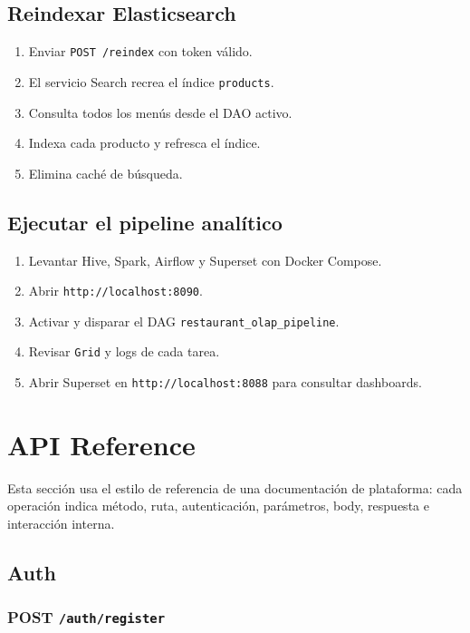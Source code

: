 \documentclass[12pt,letterpaper]{article}
\def\endpoint#1#2{\texttt{#1 #2}}
\def\codefile#1{\nolinkurl{#1}}
\def\methodpost{\textbf{\color{green!45!black}POST}}
\begin{document}
\subsection{Reindexar Elasticsearch}

\begin{enumerate}
    \item Enviar \endpoint{POST}{/reindex} con token válido.
    \item El servicio Search recrea el índice \codefile{products}.
    \item Consulta todos los menús desde el DAO activo.
    \item Indexa cada producto y refresca el índice.
    \item Elimina caché de búsqueda.
\end{enumerate}

\subsection{Ejecutar el pipeline analítico}

\begin{enumerate}
    \item Levantar Hive, Spark, Airflow y Superset con Docker Compose.
    \item Abrir \codefile{http://localhost:8090}.
    \item Activar y disparar el DAG \codefile{restaurant\_olap\_pipeline}.
    \item Revisar \codefile{Grid} y logs de cada tarea.
    \item Abrir Superset en \codefile{http://localhost:8088} para consultar dashboards.
\end{enumerate}

\section{API Reference}

Esta sección usa el estilo de referencia de una documentación de plataforma: cada operación indica método, ruta, autenticación, parámetros, body, respuesta e interacción interna.

\subsection{Auth}

\subsubsection{\methodpost{} \codefile{/auth/register}}
\end{document}
